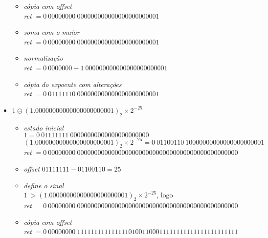 \documentclass{article}
\begin{document}
\begin{itemize}
\begin{itemize}
    \item \textit{cópia com offset} \\
    \textit{ret} $= {0}\ {00000000}\ {000000000000000000000001}$ \\
      
    \item \textit{soma com o maior} \\
    \textit{ret} $= {0}\ {00000000}\ {000000000000000000000001}$ \\

    \item \textit{normalização} \\
    \textit{ret} $= {0}\ {0000000-1}\ {000000000000000000000001}$ \\
    
    \item \textit{cópia do expoente com alterações} \\
    \textit{ret} $= {0}\ {01111110}\ {000000000000000000000001}$ \\
    \end{itemize}

\item $1 \ominus {(1.00000000000000000000001)}_{2} \times 2^{-25}$
    \begin{itemize}
        
    \item \textit{estado inicial} \\    
    $1 = {0}\ {01111111}\ {00000000000000000000000}$ \\
    ${(1.00000000000000000000001)}_{2} \times 2^{-25} = {0}\ {01100110}\ {10000000000000000000001}$ \\
    \textit{ret} $= {0}\ {00000000}\ {00000000000000000000000000000000000000000000000}$ \\

\item \textit{offset} $ {01111111} - {01100110} = 25$
    
    \item \textit{define o sinal} \\
    $1\ > {(1.00000000000000000000001)}_{2} \times 2^{-25}$, logo \\
    \textit{ret} $= {0}\ {00000000}\ {00000000000000000000000000000000000000000000000}$ \\
      
    \item \textit{cópia com offset} \\
    \textit{ret} $= {0}\ {00000000}\ {11111111111111101001100011111111111111111111111}$ \\
      

\end{itemize}
\end{itemize}
\end{document}
